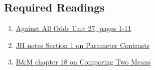 \documentclass[letterpaper,9pt,twoside,printwatermark=false]{pinp}
\begin{document}
\subsection{Required Readings}\label{required-readings}

\begin{enumerate}
\item \href{https://www.learner.org/courses/againstallodds/pdfs/AgainstAllOdds_StudentGuide_Unit27.pdf#page=1}{Against All Odds Unit 27, pages 1-11}
\item \href{https://www.dropbox.com/s/3o4vwp82lmbpgv9/EPIB607introToRegression.pdf?dl=0}{JH notes Section 1 on Parameter Contrasts}
\item \href{https://www.dropbox.com/s/pix61mnrt7j4c7t/Ch18Comparing2Means.pdf?dl=0}{B\&M chapter 18 on Comparing Two Means}
\end{enumerate}





\end{document}

